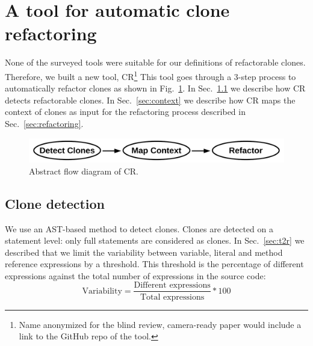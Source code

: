 \documentclass[sigconf,review,anonymous]{acmart}
\begin{document}


\section{A tool for automatic clone refactoring}\label{sec:clonerefactor}
None of the surveyed tools were suitable for our definitions of refactorable clones. Therefore, we built a new tool, CR\footnote{Name anonymized for the blind review, camera-ready paper would include a link to the GitHub repo of the tool.} This tool goes through a 3-step process to automatically refactor clones as shown in Fig.~\ref{fig:clonerefactorflow}. In Sec.~\ref{sec:detection} we describe how CR detects refactorable clones. In Sec.~\ref{sec:context} we describe how CR maps the context of clones as input for the refactoring process described in Sec.~\ref{sec:refactoring}.

\begin{figure}[H]
  \includegraphics[width=0.7\columnwidth]{img/flow}
  \caption{Abstract flow diagram of CR.}
  \label{fig:clonerefactorflow}
\end{figure}

\subsection{Clone detection}\label{sec:detection}
We use an AST-based method to detect clones. Clones are detected on a statement level: only full statements are considered as clones. In Sec.~\ref{sec:t2r} we described that we limit the variability between variable, literal and method reference expressions by a threshold. This threshold is the percentage of different expressions against the total number of expressions in the source code:
\begin{equation}\label{eq:type2r}
\text{Variability}=\frac{\text{Different expressions}}{\text{Total expressions}}*100
\end{equation}
\end{document}

